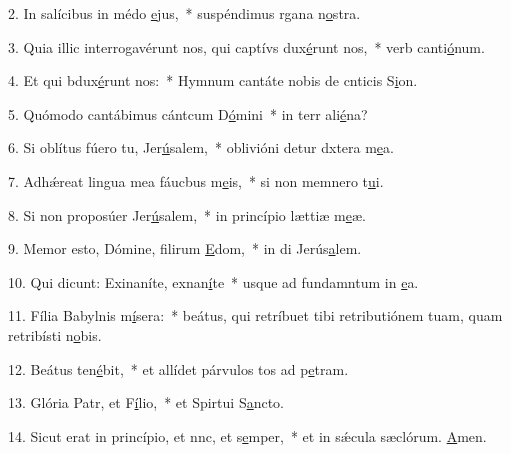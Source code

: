 2. In salícibus in médo \uline{e}jus,~* suspéndimus rgana n\uline{o}stra.\par 
3. Quia illic interrogavérunt nos, qui captívs dux\uline{é}runt nos,~* verb canti\uline{ó}num.\par 
4. Et qui bdux\uline{é}runt nos:~* Hymnum cantáte nobis de cnticis S\uline{i}on.\par 
5. Quómodo cantábimus cántcum D\uline{ó}mini~* in terr ali\uline{é}na?\par 
6. Si oblítus fúero tu, Jer\uline{ú}salem,~* oblivióni detur dxtera m\uline{e}a.\par 
7. Adhǽreat lingua mea fáucbus m\uline{e}is,~* si non memnero t\uline{u}i.\par 
8. Si non proposúer Jer\uline{ú}salem,~* in princípio lættiæ m\uline{e}æ.\par 
9. Memor esto, Dómine, filirum \uline{E}dom,~* in di Jerús\uline{a}lem.\par 
10. Qui dicunt: Exinaníte, exnan\uline{í}te~* usque ad fundamntum in \uline{e}a.\par 
11. Fília Babylnis m\uline{í}sera:~* beátus, qui retríbuet tibi retributiónem tuam, quam retribísti n\uline{o}bis.\par 
12. Beátus  ten\uline{é}bit,~* et allídet párvulos tos ad p\uline{e}tram.\par 
13. Glória Patr, et F\uline{í}lio,~* et Spirtui S\uline{a}ncto.\par 
14. Sicut erat in princípio, et nnc, et s\uline{e}mper,~* et in sǽcula sæclórum. \uline{A}men.\par 
